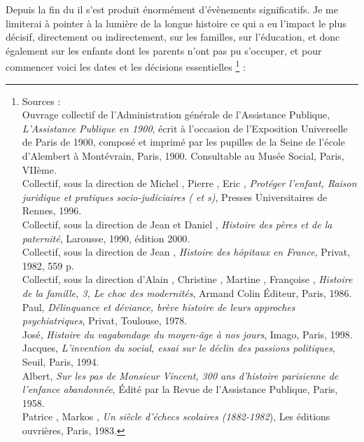 

 Depuis la fin du  il s'est produit énormément d'évènements significatifs. Je me limiterai à pointer à la lumière de la longue histoire ce qui a eu l'impact le plus décisif, directement ou indirectement, sur les familles, sur l'éducation, et donc également sur les enfants dont les parents n'ont pas pu s'occuper, et pour commencer voici les dates et les décisions essentielles%
\footnote{Sources :
\\Ouvrage collectif de l'Administration générale de l'Assistance Publique, \emph{L'Assistance Publique en 1900}, écrit à l'occasion de l'Exposition Universelle de Paris de 1900, composé et imprimé par les pupilles de la Seine de l'école d'Alembert à Montévrain, Paris, 1900. Consultable au Musée Social, Paris, VIIème.
\\Collectif, sous la direction de Michel , Pierre , Eric , \emph{Protéger l'enfant, Raison juridique et pratiques socio-judiciaires ( et s)}, Presses Universitaires de Rennes, 1996.
\\Collectif, sous la direction de Jean  et Daniel , \emph{Histoire des pères et de la paternité}, Larousse, 1990, édition 2000.
\\Collectif, sous la direction de Jean , \emph{Histoire des hôpitaux en France}, Privat, 1982, 559 p.
\\Collectif, sous la direction d'Alain , Christine , Martine , Françoise , \emph{Histoire de la famille, 3, Le choc des modernités}, Armand Colin Éditeur, Paris, 1986.
\\ Paul, \emph{Délinquance et déviance, brève histoire de leurs approches psychiatriques}, Privat, Toulouse, 1978.
\\ José, \emph{Histoire du vagabondage du moyen-âge à nos jours}, Imago, Paris, 1998.
\\ Jacques, \emph{L'invention du social, essai sur le déclin des passions politiques}, Seuil, Paris, 1994.
\\ Albert, \emph{Sur les pas de Monsieur Vincent, 300 ans d'histoire parisienne de l'enfance abandonnée}, Édité par la Revue de l'Assistance Publique, Paris, 1958.
\\Patrice {}, Markos , \emph{Un siècle d'échecs scolaires (1882-1982}), Les éditions ouvrières, Paris, 1983.}%
 :

